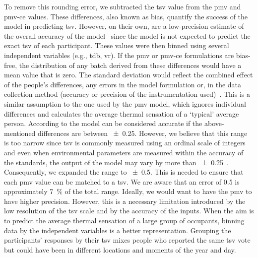 To remove this rounding error, we subtracted the \ac{tsv} value from the \ac{pmv} and \ac{pmv-ce} values.
These differences, also known as bias, quantify the success of the model in predicting \ac{tsv}.
However, on their own, are a low-precision estimate of the overall accuracy of the model~\cite{Humphreys2002} since the model is not expected to predict the exact \ac{tsv} of each participant.
These values were then binned using several independent variables (e.g., \ac{tdb}, \ac{vr}).
If the \ac{pmv} or \ac{pmv-ce} formulations are bias-free, the distribution of any batch derived from these differences would have a mean value that is zero.
The standard deviation would reflect the combined effect of the people's differences, any errors in the model formulation or, in the data collection method (accuracy or precision of the instrumentation used)~\cite{Humphreys2002}.
This is a similar assumption to the one used by the \ac{pmv} model, which ignores individual differences and calculates the average thermal sensation of a `typical' average person.
According to  the model can be considered accurate if the above-mentioned differences are between \num{\pm 0.25}.
However, we believe that this range is too narrow since \ac{tsv} is commonly measured using an ordinal scale of integers and even when environmental parameters are measured within the accuracy of the standards, the output of the model may vary by more than \num{\pm 0.25}~\cite{dambrosio_alfano_role_2011}.
Consequently, we expanded the range to \num{\pm 0.5}.
This is needed to ensure that each \ac{pmv} value can be matched to a \ac{tsv}.
We are aware that an error of \num{.5} is approximately \qty{7}{\percent} of the total range.
Ideally, we would want to have the \ac{pmv} to have higher precision.
However, this is a necessary limitation introduced by the low resolution of the \ac{tsv} scale and by the accuracy of the inputs.
When the aim is to predict the average thermal sensation of a large group of occupants, binning data by the independent variables is a better representation.
Grouping the participants' responses by their \ac{tsv} mixes people who reported the same \ac{tsv} vote but could have been in different locations and moments of the year and day.

